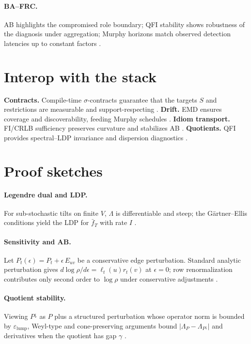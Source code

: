 \documentclass[11pt]{article}
\newcommand{\1}{\mathbbm{1}}
\begin{document}
\paragraph{BA--FRC.}
AB highlights the compromised role boundary; QFI stability shows robustness of the diagnosis under aggregation; Murphy horizons match observed detection latencies up to constant factors \parencite{elliott2025bafrc,elliott2025qfi}.

\section{Interop with the stack}\label{sec:interop}
\textbf{Contracts.} Compile-time $\sigma$-contracts guarantee that the targets $S$ and restrictions are measurable and support-respecting \parencite{elliott2025contracts,elliott2025graded}. \textbf{Drift.} EMD ensures coverage and discoverability, feeding Murphy schedules \parencite{elliott2025drift,MeynTweedie2009}. \textbf{Idiom transport.} FI/CRLB sufficiency preserves curvature and stabilizes AB \parencite{Blackwell1953,AmariNagaoka2000,Cencov1982}. \textbf{Quotients.} QFI provides spectral–LDP invariance and dispersion diagnostics \parencite{elliott2025qfi}.

\section{Proof sketches}\label{sec:proofs}
\paragraph{Legendre dual and LDP.}
For sub-stochastic tilts on finite $V$, $\Lambda$ is differentiable and steep; the G\"artner–Ellis conditions yield the LDP for $\bar f_T$ with rate $I$ \parencite{DemboZeitouni1998}.

\paragraph{Sensitivity and AB.}
Let $P_t(\epsilon)=P_t+\epsilon\,E_{uv}$ be a conservative edge perturbation. Standard analytic perturbation gives $d\log\rho/d\epsilon=\ell_t(u) r_t(v)$ at $\epsilon=0$; row renormalization contributes only second order to $\log\rho$ under conservative adjustments \parencite{Chung1997}.

\paragraph{Quotient stability.}
Viewing $P^{\downarrow}$ as $P$ plus a structured perturbation whose operator norm is bounded by $\varepsilon_{\mathrm{lump}}$, Weyl-type and cone-preserving arguments bound $|\Lambda_P-\Lambda_{P^{\downarrow}}|$ and derivatives when the quotient has gap $\gamma$ \parencite{Chung1997,elliott2025qfi}.
\end{document}
